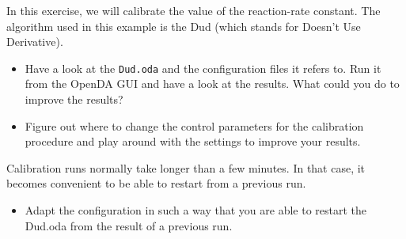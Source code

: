 

In this exercise, we will calibrate the value of the reaction-rate constant.
The algorithm used in this example is the Dud (which stands for Doesn't Use
Derivative).

\begin{itemize}
\item Have a look at the {\tt Dud.oda} and the configuration files it refers
  to. Run it from the OpenDA GUI and have a look at the results. What could you
  do to improve the results?

\item Figure out where to change the control parameters for the calibration
  procedure and play around with the settings to improve your results.

\end{itemize}

Calibration runs normally take longer than a few minutes. In that case, it
becomes convenient to be able to restart from a previous run.

\begin{itemize}
\item Adapt the configuration in such a way that you are able to restart the
  Dud.oda from the result of a previous run.
\end{itemize}
